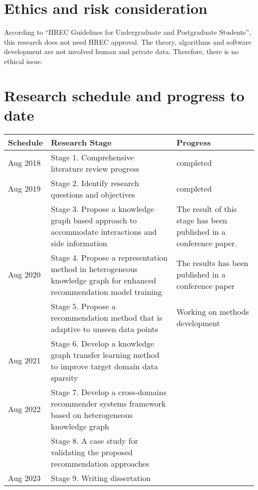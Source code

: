 \section{Ethics and risk consideration}
According to “HREC Guidelines for Undergraduate and Postgraduate Students”, this research does not need HREC approval. The theory, algorithms and software development are not involved human and private data. Therefore, there is no ethical issue.

\section{Research schedule and progress to date}
 

\begin{table}[h!]
    \begin{tabular}{ |p{2cm}|p{6cm}|p{4cm}|}
     \hline
        Schedule & Research Stage & Progress \\
     \hline
        \rowcolor{gray}
        Aug 2018  & Stage 1. Comprehensive literature review progress  & completed  \\
        \hline
        \rowcolor{gray}
        Aug 2019  & Stage 2. Identify research questions and objectives  & completed  \\
        \rowcolor{gray}
        & Stage 3. Propose a knowledge graph based approach to accommodate interactions and side information & The result of this stage has been published in a conference paper. \\
        \hline
        \rowcolor{lightgray}
        Aug 2020  & Stage 4. Propose a representation method in heterogeneous knowledge graph for enhanced recommendation model training & The results has been published in a conference paper  \\
        \rowcolor{lightgray}
        & Stage 5. Propose a recommendation method that is adaptive to unseen data points  & Working on methods development \\
        \hline
        Aug 2021  & Stage 6. Develop a knowledge graph transfer learning method to improve target domain data sparsity & \\
        \hline
        Aug 2022  & Stage 7. Develop a cross-domains recommender systems framework based on heterogeneous knowledge graph  & \\
        & Stage 8.  A case study for validating the proposed recommendation approaches  & \\
        \hline
        Aug 2023 & Stage 9. Writing dissertation & \\
      \hline
     \end{tabular}
\end{table}


